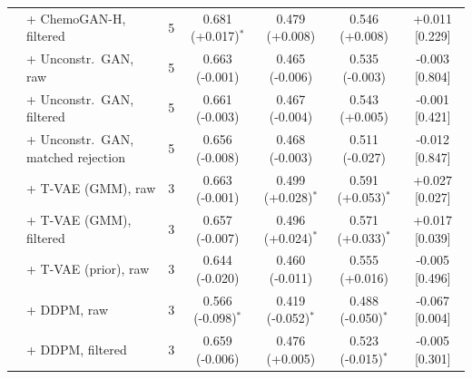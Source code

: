 \begin{tabular}{llccccc}
 & + ChemoGAN-H, filtered & 5 & 0.681 (+0.017)$^{*}$ & 0.479 (+0.008) & 0.546 (+0.008) & +0.011 [0.229] \\
 & + Unconstr.\ GAN, raw & 5 & 0.663 (-0.001) & 0.465 (-0.006) & 0.535 (-0.003) & -0.003 [0.804] \\
 & + Unconstr.\ GAN, filtered & 5 & 0.661 (-0.003) & 0.467 (-0.004) & 0.543 (+0.005) & -0.001 [0.421] \\
 & + Unconstr.\ GAN, matched rejection & 5 & 0.656 (-0.008) & 0.468 (-0.003) & 0.511 (-0.027) & -0.012 [0.847] \\
 & + T-VAE (GMM), raw & 3 & 0.663 (-0.001) & 0.499 (+0.028)$^{*}$ & 0.591 (+0.053)$^{*}$ & +0.027 [0.027] \\
 & + T-VAE (GMM), filtered & 3 & 0.657 (-0.007) & 0.496 (+0.024)$^{*}$ & 0.571 (+0.033)$^{*}$ & +0.017 [0.039] \\
 & + T-VAE (prior), raw & 3 & 0.644 (-0.020) & 0.460 (-0.011) & 0.555 (+0.016) & -0.005 [0.496] \\
 & + DDPM, raw & 3 & 0.566 (-0.098)$^{*}$ & 0.419 (-0.052)$^{*}$ & 0.488 (-0.050)$^{*}$ & -0.067 [0.004] \\
 & + DDPM, filtered & 3 & 0.659 (-0.006) & 0.476 (+0.005) & 0.523 (-0.015)$^{*}$ & -0.005 [0.301] \\
\hline
\end{tabular}